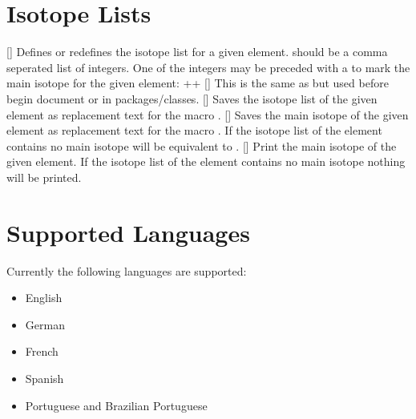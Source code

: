 \documentclass[load-preamble+]{cnltx-doc}
\begin{document}
\section{Isotope Lists}

\begin{commands}
  []
    Defines or redefines the isotope list for a given element.   should be a comma seperated list of integers.  One of the integers
    may be preceded with a \code{!} to mark the main isotope for the given
    element: \verbcode++
  []
    This is the same as  but used before begin document or
    in packages/classes.
  []
    Saves the isotope list of the given element as replacement text for the
    macro .
  []
    Saves the main isotope of the given element as replacement text for the
    macro .  If the isotope list of the element contains no main
    isotope  will be equivalent to .
  []
    Print the main isotope of the given element.  If the
    isotope list of the element contains no main isotope nothing will be
    printed.
\end{commands}

\begin{example}
  \ttfamily
  \saveelementisotopes{}
  \meaning\foo\par
  \savemainelementisotope{}
  \meaning\foo\par
  \normalfont
\end{example}

\clearpage

\section{Supported Languages}
Currently the following languages are supported:
\begin{itemize}
  \item English
  \item German
  \item French
  \item {}Spanish
  \item {}Portuguese and Brazilian Portuguese
\end{itemize}
\end{document}
